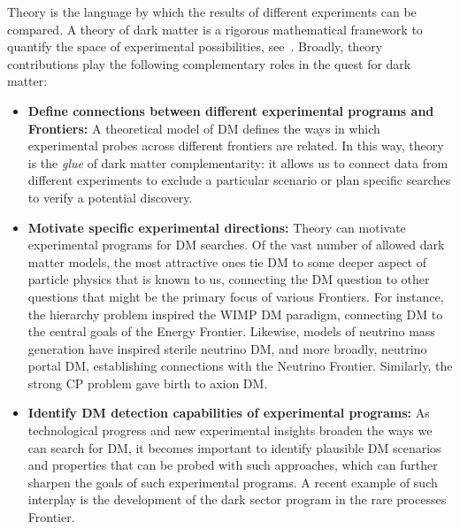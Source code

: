 \documentclass[nofootinbib]{article}
\begin{document}
Theory is the language by which the results of different experiments can be compared. 
%
A theory of dark matter is a rigorous mathematical framework to quantify the space of experimental possibilities, see~\cite{Green:2022hhj}. 
%
%
Broadly, theory contributions play the following complementary roles in the quest for dark matter:

\begin{itemize}

\item \textbf{Define connections between different experimental programs and Frontiers:} 
% 
A theoretical model of DM defines the ways in which experimental probes across different frontiers are related. In this way, theory is the \emph{glue} of dark matter complementarity: it allows us to connect data from different experiments to exclude a particular scenario or plan specific searches to verify a potential discovery.

\item \textbf{Motivate specific experimental directions:} Theory can motivate experimental programs for DM searches. Of the vast number of allowed dark matter models, the most attractive ones tie DM to some deeper aspect of particle physics that is known to us, connecting the DM question to other questions that might be the primary focus of various Frontiers. For instance, the hierarchy problem inspired the WIMP DM paradigm, connecting DM to the central goals of the Energy Frontier. Likewise, models of neutrino mass generation have inspired sterile neutrino DM, and more broadly, neutrino portal DM, establishing connections with the Neutrino Frontier. Similarly, the strong CP problem gave birth to axion DM. 

\item \textbf{Identify DM detection capabilities of experimental programs:} As technological progress and new experimental insights broaden the ways we can search for DM, it becomes important to identify plausible DM scenarios and properties that can be probed with such approaches, which can further sharpen the goals of such experimental programs. A recent example of such interplay is the development of the dark sector program in the rare processes Frontier. 


\end{itemize}
\end{document}
